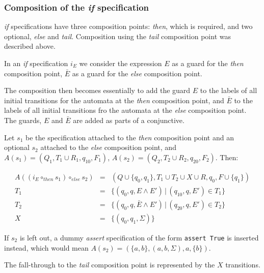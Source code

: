 \documentclass[a4paper,11pt]{kth-mag}
\begin{document}
\subsubsection{Composition of the \textit{if} specification}

\textit{if} specifications have three composition points: \textit{then}, which
is required, and two optional, \textit{else} and \textit{tail}. Composition
using the \textit{tail} composition point was described above.

In an \textit{if} specification $i_E$ we consider the expression $E$ as a guard
for the \textit{then} composition point, $\bar{E}$ as a guard for the
\textit{else} composition point.

The composition then becomes essentially to add the guard $E$ to the labels of
all initial transitions for the automata at the \textit{then} composition
point, and $\bar{E}$ to the labels of all initial transitions fro the automata
at the \textit{else} composition point. The guards, $E$ and $\bar{E}$ are added
as parts of a conjunctive.

Let $s_1$ be the specification attached to the \textit{then} composition point
and an optional $s_2$ attached to the \textit{else} composition point, and
$A(s_1) = (Q_1, T_1 \cup R_1, q_{10}, F_1)$, $A(s_2) = (Q_2, T_2 \cup R_2,
q_{20}, F_2)$. Then:

\[
  \begin{array}{rcl}
  A((i_E \circ_{then} s_1) \circ_{else} s_2) & = & (Q \cup \{q_0, q_1\}, T_1 \cup T_2 \cup X \cup R, q_0, F \cup \{q_1\}) \\
                                        T_1  & = & \{(q_0, q, E       \wedge E') \, | \, (q_{10}, q, E') \in T_1\} \\
                                        T_2  & = & \{(q_0, q, \bar{E} \wedge E') \, | \, (q_{20}, q, E') \in T_2\} \\
                                         X   & = & \{(q_0, q_1, \Sigma)\}
  \end{array}
\]

If $s_2$ is left out, a dummy \textit{assert} specification of the form
\texttt{assert True} is inserted instead, which would mean $A(s_2) =
(\{a,b\}, (a, b, \Sigma), a, \{b\})$.

The fall-through to the \textit{tail} composition point is represented by the
$X$ transitions.

\end{document}
